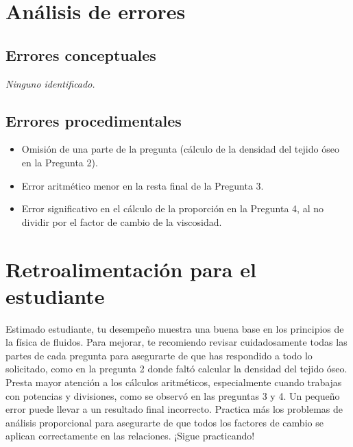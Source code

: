 \documentclass[11pt,a4paper]{article}
\begin{document}
\section*{Análisis de errores}

\subsection*{Errores conceptuales}
\textit{Ninguno identificado.}

\subsection*{Errores procedimentales}
\begin{itemize}[leftmargin=1.5em, itemsep=2pt]
  \item Omisión de una parte de la pregunta (cálculo de la densidad del tejido óseo en la Pregunta 2).
  \item Error aritmético menor en la resta final de la Pregunta 3.
  \item Error significativo en el cálculo de la proporción en la Pregunta 4, al no dividir por el factor de cambio de la viscosidad.
\end{itemize}

\section*{Retroalimentación para el estudiante}
\begin{tcolorbox}[cajaRecomendacion, title={Dirigido a: ana alcala 30749815}]
Estimado estudiante, tu desempeño muestra una buena base en los principios de la física de fluidos. Para mejorar, te recomiendo revisar cuidadosamente todas las partes de cada pregunta para asegurarte de que has respondido a todo lo solicitado, como en la pregunta 2 donde faltó calcular la densidad del tejido óseo. Presta mayor atención a los cálculos aritméticos, especialmente cuando trabajas con potencias y divisiones, como se observó en las preguntas 3 y 4. Un pequeño error puede llevar a un resultado final incorrecto. Practica más los problemas de análisis proporcional para asegurarte de que todos los factores de cambio se aplican correctamente en las relaciones. ¡Sigue practicando!
\end{tcolorbox}

\end{document}
